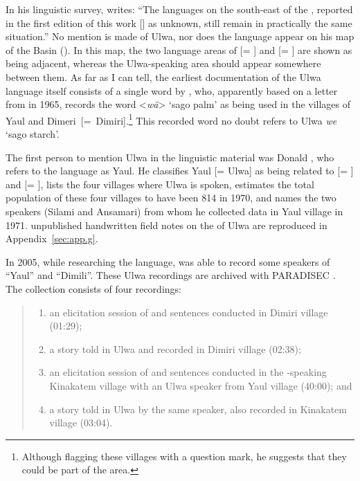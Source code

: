   In his linguistic survey, \citet[48]{Capell1962} writes: “The languages on the south-east of the , reported in the first edition of this work [\citep{Capell1954}] as unknown, still remain in practically the same situation.” No mention is made of Ulwa, nor does the language appear on his map of the  Basin (\citealt[38--39]{Capell1962}). In this map, the two language areas of  [= ] and  [= ] are shown as being adjacent, whereas the Ulwa-speaking area should appear somewhere between them. As far as I can tell, the earliest documentation of the Ulwa language itself consists of a single word by \linebreak \citet[95]{Haberland1966}, who, apparently based on a letter from  in 1965, records the word <\textit{wä}> ‘sago palm’ as being used in the villages of Yaul and \mbox{Dimeri [= Dimiri].}\footnote{Although flagging these villages with a question mark, he suggests that they could be part of the   area.} This recorded word no doubt refers to Ulwa \textit{we} ‘sago starch’.

The first person to mention Ulwa in the linguistic material was Donald \linebreak \citet[36]{Laycock1973}, who refers to the language as Yaul. He classifies Yaul [= Ulwa] as being related to  [= ] and  [= ], lists the four villages where Ulwa is spoken, estimates the total population of these four villages to have been 814 in 1970, and names the two speakers (Silami and Ansamari) from whom he collected data in Yaul village in 1971.  unpublished handwritten field notes on the   of Ulwa are reproduced in \mbox{Appendix \ref{sec:app.g}.}

In 2005, while researching the  language,  was able to record some speakers of “Yaul” and “Dimili”. These Ulwa recordings are archived with PARADISEC \citep{McElvenny2005}. The collection consists of four recordings:

\begin{quote}
\begin{enumerate}[noitemsep, label={(\roman*)}, align=left, widest=190, labelsep=1ex,leftmargin=*]
\item an elicitation session of  and sentences conducted in Dimiri village (01:29);
\item a story told in Ulwa and  recorded in Dimiri village (02:38);
\item an elicitation session of  and sentences conducted in the -speaking Kinakatem village with an Ulwa speaker from Yaul village (40:00); and
\item a story told in Ulwa by the same speaker, also recorded in Kinakatem village (03:04).
\end{enumerate}
\end{quote}

